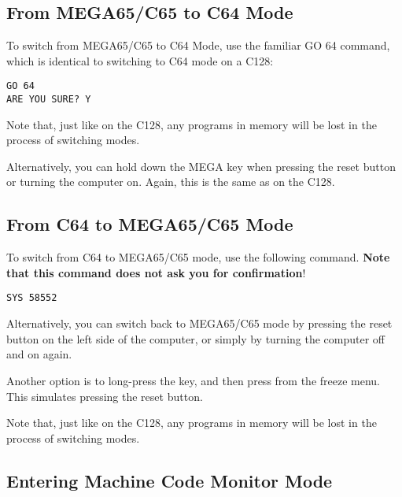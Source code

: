 \subsection{From MEGA65/C65 to C64 Mode}

To switch from MEGA65/C65 to C64 Mode, use the familiar GO 64 command, which is identical to switching to C64
mode on a C128:

\begin{tcolorbox}[colback=black,coltext=white]
\verbatimfont{\codefont}
\begin{verbatim}
GO 64
ARE YOU SURE? Y
\end{verbatim}
\end{tcolorbox}

Note that, just like on the C128, any programs in memory will be lost in the process of switching modes.

Alternatively, you can hold down the MEGA key when pressing the reset button or turning the computer on. Again,
this is the same as on the C128.

\subsection{From C64 to MEGA65/C65 Mode}

To switch from C64 to MEGA65/C65 mode, use the following command. {\bf Note that this command does not ask you for
confirmation}!

\begin{tcolorbox}[colback=black,coltext=white]
\verbatimfont{\codefont}
\begin{verbatim}
SYS 58552
\end{verbatim}
\end{tcolorbox}

Alternatively, you can switch back to MEGA65/C65 mode by pressing the reset
button on the left side of the computer, or simply by turning the
computer off and on again.

Another option is to long-press the  key, and then press 
from the freeze menu.  This simulates pressing the reset button.

Note that, just like on the C128, any programs in memory will be
lost in the process of switching modes.

\subsection{Entering Machine Code Monitor Mode}

